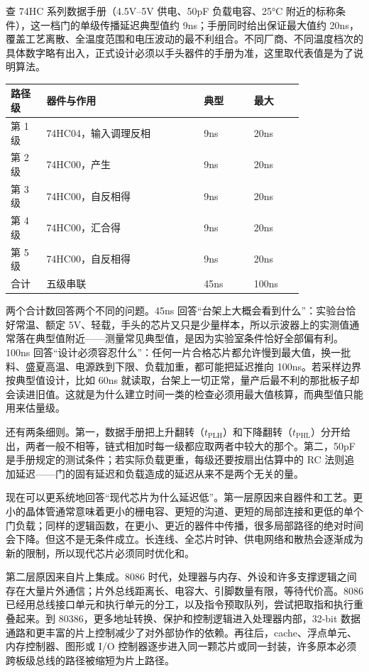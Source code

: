 查 74HC 系列数据手册（4.5V–5V 供电、50pF 负载电容、25°C 附近的标称条件），这一档门的单级传播延迟典型值约 9ns；手册同时给出保证最大值约 20ns，覆盖工艺离散、全温度范围和电压波动的最不利组合。不同厂商、不同温度档次的具体数字略有出入，正式设计必须以手头器件的手册为准，这里取代表值是为了说明算法。

\begin{longtable}{L{0.1\linewidth}L{0.44\linewidth}L{0.14\linewidth}L{0.14\linewidth}}
\toprule
路径级 & 器件与作用 & 典型 & 最大 \\
\midrule
第 1 级 & 74HC04，输入调理反相 & 9ns & 20ns \\
第 2 级 & 74HC00，产生  & 9ns & 20ns \\
第 3 级 & 74HC00，自反相得  & 9ns & 20ns \\
第 4 级 & 74HC00，汇合得  & 9ns & 20ns \\
第 5 级 & 74HC00，自反相得  & 9ns & 20ns \\
合计 & 五级串联 & 45ns & 100ns \\
\bottomrule
\end{longtable}

两个合计数回答两个不同的问题。45ns 回答“台架上大概会看到什么”：实验台恰好常温、额定 5V、轻载，手头的芯片又只是少量样本，所以示波器上的实测值通常落在典型值附近——测量常见典型值，是因为实验室条件恰好全部偏有利。100ns 回答“设计必须容忍什么”：任何一片合格芯片都允许慢到最大值，换一批料、盛夏高温、电源跌到下限、负载加重，都可能把延迟推向 100ns。若采样边界按典型值设计，比如 60ns 就读取，台架上一切正常，量产后最不利的那批板子却会读进旧值。这就是为什么建立时间一类的检查必须用最大值核算，而典型值只能用来估量级。

还有两条细则。第一，数据手册把上升翻转（$t_\mathrm{PLH}$）和下降翻转（$t_\mathrm{PHL}$）分开给出，两者一般不相等，链式相加时每一级都应取两者中较大的那个。第二，50pF 是手册规定的测试条件；若实际负载更重，每级还要按扇出估算中的 RC 法则追加延迟——门的固有延迟和负载造成的延迟从来不是两个无关的量。

现在可以更系统地回答“现代芯片为什么延迟低”。第一层原因来自器件和工艺。更小的晶体管通常意味着更小的栅电容、更短的沟道、更短的局部连接和更低的单个门负载；同样的逻辑函数，在更小、更近的器件中传播，很多局部路径的绝对时间会下降。但这不是无条件成立。长连线、全芯片时钟、供电网络和散热会逐渐成为新的限制，所以现代芯片必须同时优化和。

第二层原因来自片上集成。8086 时代，处理器与内存、外设和许多支撑逻辑之间存在大量片外通信；片外总线距离长、电容大、引脚数量有限，等待代价高。8086 已经用总线接口单元和执行单元的分工，以及指令预取队列，尝试把取指和执行重叠起来。到 80386，更多地址转换、保护和控制逻辑进入处理器内部，32-bit 数据通路和更丰富的片上控制减少了对外部协作的依赖。再往后，cache、浮点单元、内存控制器、图形或 I/O 控制器逐步进入同一颗芯片或同一封装，许多原本必须跨板级总线的路径被缩短为片上路径。

